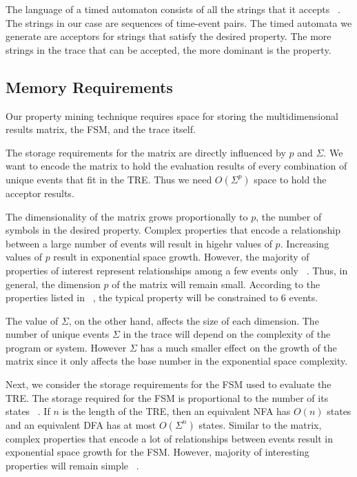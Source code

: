 \documentclass[]{sigplanconf}
\begin{document}
The language of a timed automaton consists of all the strings that it accepts ~\cite{timedregex}. The strings in our case are sequences of time-event pairs. The timed automata we generate are acceptors for strings that satisfy the desired property. The more strings in the trace that can be accepted, the more dominant is the property.

\subsection{Memory Requirements}

Our property mining technique requires space for storing the multidimensional results matrix, the FSM, and
the trace itself.

The storage requirements for the matrix are directly influenced by $p$ and $\Sigma$.
We want to encode the matrix to hold the evaluation results of every combination of unique events that fit in the TRE.
Thus we need $O(\Sigma^p)$ space to hold the acceptor results.

The dimensionality of the matrix grows proportionally to $p$, the number of symbols in the desired property.
Complex properties that encode a relationship between a large number of events will result in higehr values of $p$.
Increasing values of $p$ result in exponential space growth.
However, the majority of properties of interest represent relationships among a few events only ~\cite{evans1, dwyer1999patterns}.
Thus, in general, the dimension $p$ of the matrix will remain small.
According to the properties listed in ~\cite{dwyer1999patterns, dwyer2}, the typical property will be constrained to 6 events.

The value of $\Sigma$, on the other hand, affects the size of each dimension.
The number of unique events $\Sigma$ in the trace will depend on the complexity of the program or system.
However $\Sigma$ has a much smaller effect on the growth of the matrix since it only affects the base number in the
exponential space complexity.


Next, we consider the storage requirements for the FSM used to evaluate the TRE.
The storage required for the FSM is proportional to the number of its states ~\cite{book1}.
If $n$ is the length of the TRE, then an equivalent NFA has $O(n)$ states
and an equivalent DFA has at most $O(\Sigma^n)$ states. Similar to the matrix, complex properties that encode a lot of relationships between events result in exponential space growth for the FSM. However, majority of interesting properties will remain simple ~\cite{dwyer1999patterns}.
\end{document}
